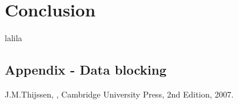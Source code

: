 \documentclass[twoside]{article}
\begin{document}
\begin{multicols}{2}
\section{Conclusion}
lalila

\begin{appendices}
\section{Appendix - Data blocking}

\end{appendices}


\begin{thebibliography}{99} %

J.M.Thijssen,
, Cambridge University Press, 2nd Edition, 2007.
\end{thebibliography}

\end{multicols}
\end{document}
